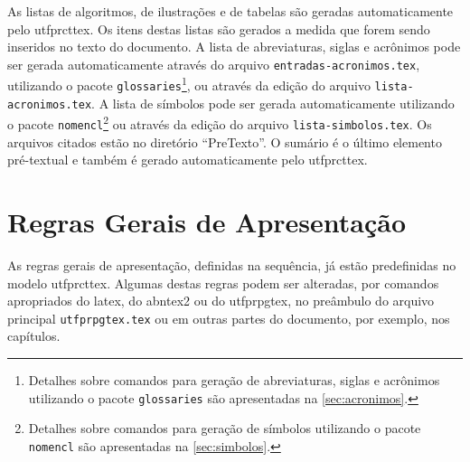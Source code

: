 As listas de algoritmos, de ilustrações e de tabelas são geradas automaticamente pelo \gls{utfprcttex}. Os itens destas listas são gerados a medida que forem sendo inseridos no texto do documento. A lista de abreviaturas, siglas e acrônimos pode ser gerada automaticamente através do arquivo \texttt{entradas-acronimos.tex}, utilizando o pacote \texttt{glossaries}\footnote{Detalhes sobre comandos para geração de abreviaturas, siglas e acrônimos utilizando o pacote \texttt{glossaries} são apresentadas na \autoref{sec:acronimos}.}, ou através da edição do arquivo \texttt{lista-acronimos.tex}. A lista de símbolos pode ser gerada automaticamente utilizando o pacote \texttt{nomencl}\footnote{Detalhes sobre comandos para geração de símbolos utilizando o pacote \texttt{nomencl} são apresentadas na \autoref{sec:simbolos}.} ou através da edição do arquivo \texttt{lista-simbolos.tex}. Os arquivos citados estão no diretório ``PreTexto''. O sumário é o último elemento pré-textual e também é gerado automaticamente pelo \gls{utfprcttex}.

\section{Regras Gerais de Apresentação}\label{sec:regrasgerais}

As regras gerais de apresentação, definidas na sequência, já estão predefinidas no modelo \gls{utfprcttex}. Algumas destas regras podem ser alteradas, por comandos apropriados do \gls{latex}, do \gls{abntex2} ou do \gls{utfprpgtex}, no preâmbulo do arquivo principal \texttt{utfprpgtex.tex} ou em outras partes do documento, por exemplo, nos capítulos.

